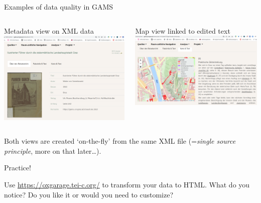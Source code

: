 \begin{frame}[allowframebreaks]{Examples of data quality in GAMS}
\begin{columns}
   \begin{block}{Metadata view on XML data}
    \includegraphics[width=\textwidth]{img/gams-beurb1.png}
   \end{block}
    \begin{block}{Map view linked to edited text} 
    \includegraphics[width=\textwidth]{img/gams-beurb2.png}
    \end{block}
    \end{columns}
    Both views are created `on-the-fly' from the same XML file (=\emph{single source principle}, more on that later\dots).
\end{frame}





\begin{frame}[standout]

  \alert{Practice!}
  
  \normalsize
  Use \alert{\protect\url{https://oxgarage.tei-c.org/}} to transform your data to HTML. What do you notice? Do you like it or would you need to customize?
\end{frame}



